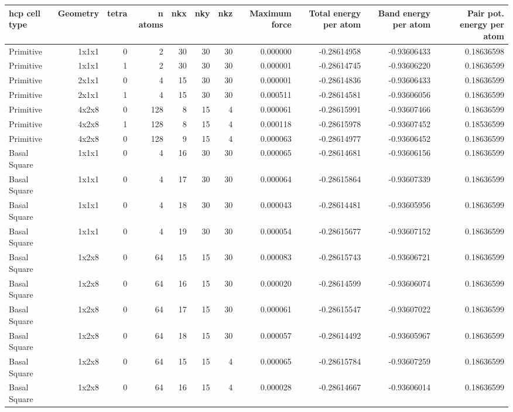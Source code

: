 \documentclass[11pt]{article}
\begin{document}
\begin{center}
\begin{tabular}{lrrrrrrrrrr}
hcp cell type & Geometry & tetra & n atoms & nkx & nky & nkz & Maximum force & Total energy per atom & Band energy per atom & Pair pot. energy per atom\\
\hline
Primitive & 1x1x1 & 0 & 2 & 30 & 30 & 30 & 0.000000 & -0.28614958 & -0.93606433 & 0.18636598\\
Primitive & 1x1x1 & 1 & 2 & 30 & 30 & 30 & 0.000001 & -0.28614745 & -0.93606220 & 0.18636599\\
Primitive & 2x1x1 & 0 & 4 & 15 & 30 & 30 & 0.000001 & -0.28614836 & -0.93606433 & 0.18636599\\
Primitive & 2x1x1 & 1 & 4 & 15 & 30 & 30 & 0.000511 & -0.28614581 & -0.93606056 & 0.18636599\\
Primitive & 4x2x8 & 0 & 128 & 8 & 15 & 4 & 0.000061 & -0.28615991 & -0.93607466 & 0.18636599\\
Primitive & 4x2x8 & 1 & 128 & 8 & 15 & 4 & 0.000118 & -0.28615978 & -0.93607452 & 0.18536599\\
Primitive & 4x2x8 & 0 & 128 & 9 & 15 & 4 & 0.000063 & -0.28614977 & -0.93606452 & 0.18636599\\
Basal Square & 1x1x1 & 0 & 4 & 16 & 30 & 30 & 0.000065 & -0.28614681 & -0.93606156 & 0.18636599\\
Basal Square & 1x1x1 & 0 & 4 & 17 & 30 & 30 & 0.000064 & -0.28615864 & -0.93607339 & 0.18636599\\
Basal Square & 1x1x1 & 0 & 4 & 18 & 30 & 30 & 0.000043 & -0.28614481 & -0.93605956 & 0.18636599\\
Basal Square & 1x1x1 & 0 & 4 & 19 & 30 & 30 & 0.000054 & -0.28615677 & -0.93607152 & 0.18636599\\
Basal Square & 1x2x8 & 0 & 64 & 15 & 15 & 30 & 0.000083 & -0.28615743 & -0.93606721 & 0.18636599\\
Basal Square & 1x2x8 & 0 & 64 & 16 & 15 & 30 & 0.000020 & -0.28614599 & -0.93606074 & 0.18636599\\
Basal Square & 1x2x8 & 0 & 64 & 17 & 15 & 30 & 0.000061 & -0.28615547 & -0.93607022 & 0.18636599\\
Basal Square & 1x2x8 & 0 & 64 & 18 & 15 & 30 & 0.000057 & -0.28614492 & -0.93605967 & 0.18636599\\
Basal Square & 1x2x8 & 0 & 64 & 15 & 15 & 4 & 0.000065 & -0.28615784 & -0.93607259 & 0.18636599\\
Basal Square & 1x2x8 & 0 & 64 & 16 & 15 & 4 & 0.000028 & -0.28614667 & -0.93606014 & 0.18636599\\

\end{tabular}
\end{center}
\end{document}

